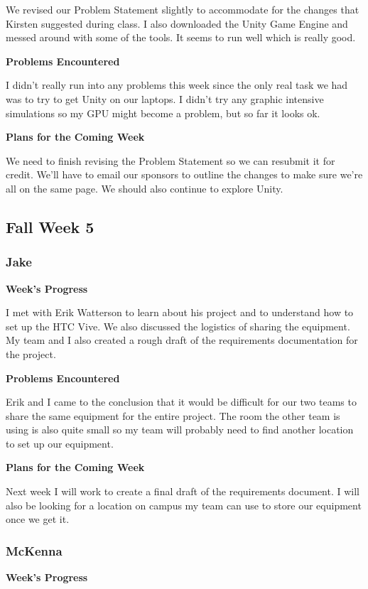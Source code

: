 \documentclass[10pt,journal,compsoc,onecolumn, draftclsnofoot]{IEEEtran}
\begin{document}
We revised our Problem Statement slightly to accommodate for the changes that Kirsten suggested during class. I also downloaded the Unity Game Engine and messed around with some of the tools. It seems to run well which is really good.

\noindent \textbf{Problems Encountered}

I didn't really run into any problems this week since the only real task we had was to try to get Unity on our laptops. I didn't try any graphic intensive simulations so my GPU might become a problem, but so far it looks ok.

\noindent \textbf{Plans for the Coming Week}

We need to finish revising the Problem Statement so we can resubmit it for credit. We'll have to email our sponsors to outline the changes to make sure we're all on the same page. We should also continue to explore Unity.

\subsection{Fall Week 5}
\subsubsection{Jake}
\noindent \textbf{Week's Progress}

I met with Erik Watterson to learn about his project and to understand how to set up the HTC Vive. We also discussed the logistics of sharing the equipment. My team and I also created a rough draft of the requirements documentation for the project.

\noindent \textbf{Problems Encountered}

Erik and I came to the conclusion that it would be difficult for our two teams to share the same equipment for the entire project. The room the other team is using is also quite small so my team will probably need to find another location to set up our equipment.

\noindent \textbf{Plans for the Coming Week}

Next week I will work to create a final draft of the requirements document. I will also be looking for a location on campus my team can use to store our equipment once we get it.

\subsubsection{McKenna}
\noindent \textbf{Week's Progress}
\end{document}
